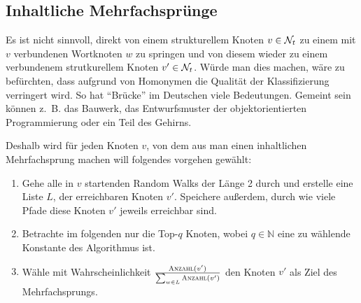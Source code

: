 \subsection{Inhaltliche Mehrfachsprünge}
Es ist nicht sinnvoll, direkt von einem strukturellem Knoten 
$v \in \mathcal{N}_t$ zu einem mit $v$ verbundenen Wortknoten $w$ zu springen
und von diesem wieder zu einem verbundenem strutkurellem Knoten 
$v' \in \mathcal{N}_t$. Würde man dies machen, wäre zu befürchten, dass
aufgrund von Homonymen die Qualität der Klassifizierung verringert
wird. So hat \enquote{Brücke} im Deutschen viele Bedeutungen.
Gemeint sein können z.~B. das Bauwerk, das Entwurfsmuster der
objektorientierten Programmierung oder ein Teil des Gehirns.

Deshalb wird für jeden Knoten $v$, von dem aus man einen inhaltlichen
Mehrfachsprung machen will folgendes vorgehen gewählt:
\begin{enumerate}
    \item Gehe alle in $v$ startenden Random Walks der Länge 2 durch
          und erstelle eine Liste $L$, der erreichbaren Knoten $v'$. Speichere
          außerdem, durch wie viele Pfade diese Knoten $v'$ jeweils erreichbar sind.
    \item Betrachte im folgenden nur die Top-$q$ Knoten, wobei $q \in \mathbb{N}$
          eine zu wählende Konstante des Algorithmus ist.
    \item Wähle mit Wahrscheinlichkeit $\frac{\Call{Anzahl}{v'}}{\sum_{w \in L} \Call{Anzahl}{v'}}$
          den Knoten $v'$ als Ziel des Mehrfachsprungs.
\end{enumerate}


